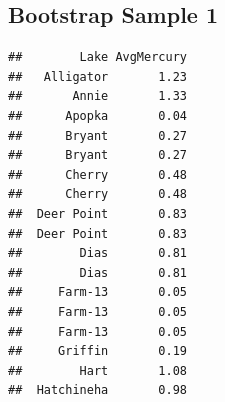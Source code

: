 \documentclass[]{book}
\newenvironment{Shaded}{\begin{snugshade}}{\end{snugshade}}
\newcommand{\KeywordTok}[1]{\textcolor[rgb]{0.13,0.29,0.53}{\textbf{#1}}}
\newcommand{\DataTypeTok}[1]{\textcolor[rgb]{0.13,0.29,0.53}{#1}}
\newcommand{\DecValTok}[1]{\textcolor[rgb]{0.00,0.00,0.81}{#1}}
\newcommand{\StringTok}[1]{\textcolor[rgb]{0.31,0.60,0.02}{#1}}
\newcommand{\OtherTok}[1]{\textcolor[rgb]{0.56,0.35,0.01}{#1}}
\newcommand{\OperatorTok}[1]{\textcolor[rgb]{0.81,0.36,0.00}{\textbf{#1}}}
\newcommand{\NormalTok}[1]{#1}
\begin{document}
\begin{Shaded}
\end{Shaded}

\begin{Shaded}
\end{Shaded}

\begin{Shaded}
\end{Shaded}

\begin{Shaded}
\end{Shaded}

\subsection{Bootstrap Sample 1}\label{bootstrap-sample-1}

\begin{verbatim}
##        Lake AvgMercury
##   Alligator       1.23
##       Annie       1.33
##      Apopka       0.04
##      Bryant       0.27
##      Bryant       0.27
##      Cherry       0.48
##      Cherry       0.48
##  Deer Point       0.83
##  Deer Point       0.83
##        Dias       0.81
##        Dias       0.81
##     Farm-13       0.05
##     Farm-13       0.05
##     Farm-13       0.05
##     Griffin       0.19
##        Hart       1.08
##  Hatchineha       0.98
\end{verbatim}
\end{document}
